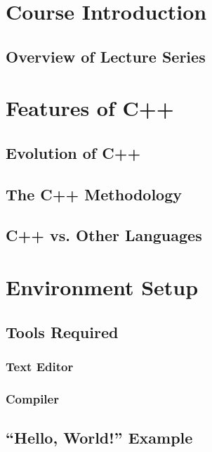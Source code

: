 \documentclass{article}
\title{\thistitle}
\author{\me}
\date{\today}
\begin{document}
\maketitle
\tableofcontents

\section{Course Introduction}

\subsection{Overview of Lecture Series}

\section{Features of C++}

\subsection{Evolution of C++}

\subsection{The C++ Methodology}

\subsection{C++ vs. Other Languages}

\section{Environment Setup}

\subsection{Tools Required}

\subsubsection{Text Editor}

\subsubsection{Compiler}

\subsection{``Hello, World!'' Example}
\end{document}
